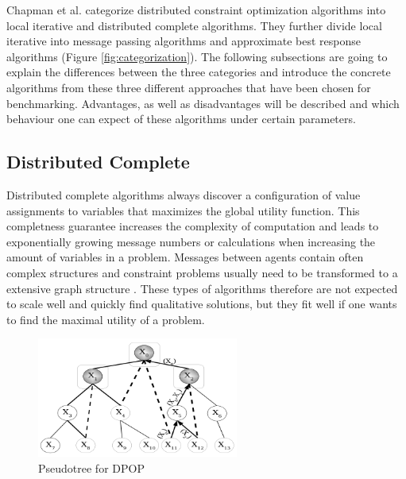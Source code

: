 Chapman et al. categorize distributed constraint optimization algorithms into local iterative and distributed complete algorithms. They further divide local iterative into message passing algorithms and approximate best response algorithms (Figure \ref{fig:categorization}). The following subsections are going to explain the differences between the three categories and introduce the concrete algorithms from these three different approaches that have been chosen for benchmarking. Advantages, as well as disadvantages will be described and which behaviour one can expect of these algorithms under certain parameters.

    
\subsection{Distributed Complete}

Distributed complete algorithms always discover a configuration of value assignments to variables that maximizes the global utility function. This completness guarantee increases the complexity of computation and leads to exponentially growing message numbers or calculations when increasing the amount of variables in a problem. Messages between agents contain often complex structures and constraint problems usually need to be transformed to a extensive graph structure \cite{Chapman2011}. These types of algorithms therefore are not expected to scale well and quickly find qualitative solutions, but they fit well if one wants to find the maximal utility of a problem. 
\begin{figure}[H]
\centering
\includegraphics[width=250px]{graphics/pseudotree}
\caption{Pseudotree for DPOP \cite{Petcu2003}}
\label{fig:pseudotree}
\end{figure}

